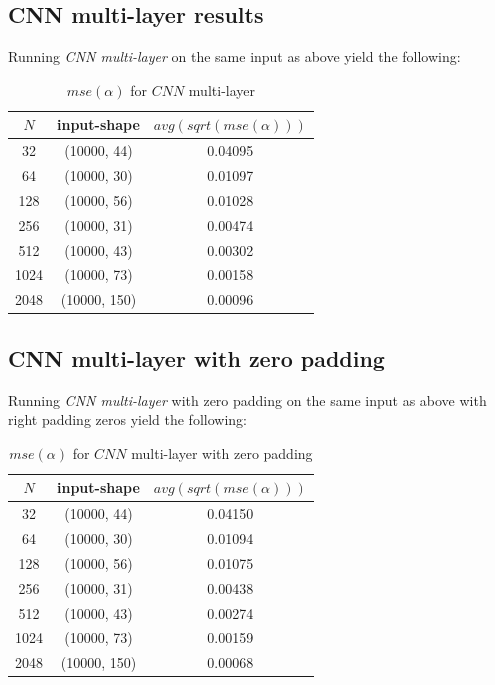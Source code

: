 \documentclass[a4paper, 12pt]{report}
\begin{document}
\newpage
\subsection{CNN multi-layer results}
\par Running \textit{CNN multi-layer} on the same input as above yield the following:
\begin{table}[h!]
    \centering
    \begin{tabular}{||c c c||} 
        \hline
        $N$ & input-shape & $avg(sqrt(mse(\alpha)))$ \\ [0.5ex] 
        \hline\hline
        32 & (10000, 44) & 0.04095 \\ 
        \hline
        64 & (10000, 30) & 0.01097 \\
        \hline
        128 & (10000, 56) & 0.01028 \\
        \hline
        256 & (10000, 31) & 0.00474 \\
        \hline
        512 & (10000, 43) & 0.00302 \\ 
        \hline
        1024 & (10000, 73) & 0.00158 \\ 
        \hline
        2048 & (10000, 150) & 0.00096 \\ 
        \hline
    \end{tabular}
    \caption{$mse(\alpha)$ for $CNN$ multi-layer}
    \label{table:cnn-multi-sqrt-mse}
\end{table}

\subsection{CNN multi-layer with zero padding}
\par Running \textit{CNN multi-layer} with zero padding on the same input as above with right padding zeros yield the following:
\begin{table}[h!]
    \centering
    \begin{tabular}{||c c c||} 
        \hline
        $N$ & input-shape & $avg(sqrt(mse(\alpha)))$ \\ [0.5ex] 
        \hline\hline
        32 & (10000, 44) & 0.04150 \\ 
        \hline
        64 & (10000, 30) & 0.01094 \\
        \hline
        128 & (10000, 56) & 0.01075 \\
        \hline
        256 & (10000, 31) & 0.00438 \\
        \hline
        512 & (10000, 43) & 0.00274 \\ 
        \hline
        1024 & (10000, 73) & 0.00159 \\ 
        \hline
        2048 & (10000, 150) & 0.00068 \\ 
        \hline
    \end{tabular}
    \caption{$mse(\alpha)$ for $CNN$ multi-layer with zero padding}
    \label{table:cnn-multi-zeros-sqrt-mse}
\end{table}
\end{document}
